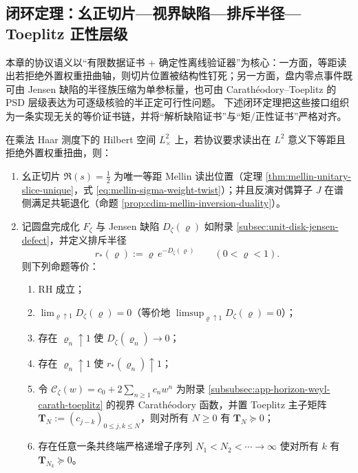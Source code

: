 \subsection{闭环定理：幺正切片—视界缺陷—排斥半径—Toeplitz 正性层级}\label{subsec:cdim-closed-loop-theorem}
本章的协议语义以“有限数据证书 + 确定性离线验证器”为核心：一方面，等距读出若拒绝外置权重扭曲轴，则切片位置被结构性钉死；另一方面，盘内零点事件既可由 Jensen 缺陷的半径族压缩为单参标量，也可由 Carath\'eodory--Toeplitz 的 PSD 层级表达为可逐级核验的半正定可行性问题。
下述闭环定理把这些接口组织为一条实现无关的等价证书链，并将“解析缺陷证书”与“矩/正性证书”严格对齐。

\begin{theorem}\label{thm:cdim-closed-loop-unitary-horizon-repulsion-toeplitz}
在乘法 Haar 测度下的 Hilbert 空间 \(L^2_{\times}\) 上，若协议要求读出在 \(L^{2}\) 意义下等距且拒绝外置权重扭曲，则：
\begin{enumerate}
  \item 幺正切片 \(\Re(s)=\tfrac12\) 为唯一等距 Mellin 读出位置（定理 \ref{thm:mellin-unitary-slice-unique}，式 \eqref{eq:mellin-sigma-weight-twist}）；并且反演对偶算子 \(J\) 在谱侧满足共轭退化（命题 \ref{prop:cdim-mellin-inversion-duality}）。
  \item 记圆盘完成化 \(F_{\zeta}\) 与 Jensen 缺陷 \(D_{\zeta}(\varrho)\) 如附录 \ref{subsec:unit-disk-jensen-defect}，并定义排斥半径
  \[
  r_{\ast}(\varrho):=\varrho\,e^{-D_{\zeta}(\varrho)}\qquad(0<\varrho<1).
  \]
  则下列命题等价：
  \begin{enumerate}
    \item RH 成立；
    \item \(\displaystyle \lim_{\varrho\uparrow 1}D_{\zeta}(\varrho)=0\)（等价地 \(\displaystyle \limsup_{\varrho\uparrow 1}D_{\zeta}(\varrho)=0\)）；
    \item 存在 \(\varrho_n\uparrow 1\) 使 \(D_{\zeta}(\varrho_n)\to 0\)；
    \item 存在 \(\varrho_n\uparrow 1\) 使 \(r_{\ast}(\varrho_n)\uparrow 1\)；
    \item 令 \(\mathscr{C}_{\zeta}(w)=c_0+2\sum_{n\ge 1}c_n w^n\) 为附录 \ref{subsubsec:app-horizon-weyl-carath-toeplitz} 的视界 Carath\'eodory 函数，并置 Toeplitz 主子矩阵 \(\mathbf{T}_N:=(c_{j-k})_{0\le j,k\le N}\)，则对所有 \(N\ge 0\) 有 \(\mathbf{T}_N\succeq 0\)；
    \item 存在任意一条共终端严格递增子序列 \(N_1<N_2<\cdots\to\infty\) 使对所有 \(k\) 有 \(\mathbf{T}_{N_k}\succeq 0\)。
  \end{enumerate}
\end{enumerate}
\end{theorem}
